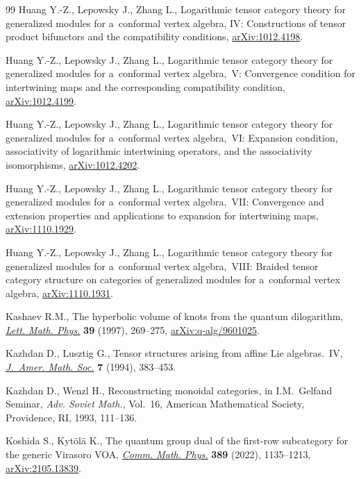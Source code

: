 \documentclass[pdftex]{sigma}
\numberwithin{equation}{section}
\theoremstyle{definition}
\begin{document}
\begin{thebibliography}{99}
Huang Y.-Z., Lepowsky J., Zhang L., Logarithmic tensor category theory for
 generalized modules for a~conformal vertex algebra, {IV}: {C}onstructions of
 tensor product bifunctors and the compatibility conditions,
 \href{http://arxiv.org/abs/1012.4198}{arXiv:1012.4198}.

Huang Y.-Z., Lepowsky J., Zhang L., Logarithmic tensor category theory for
 generalized modules for a~conformal vertex algebra,~{V}: {C}onvergence
 condition for intertwining maps and the corresponding compatibility
 condition, \href{http://arxiv.org/abs/1012.4199}{arXiv:1012.4199}.

Huang Y.-Z., Lepowsky J., Zhang L., Logarithmic tensor category theory for
 generalized modules for a~conformal vertex algebra,~{VI}: {E}xpansion
 condition, associativity of logarithmic intertwining operators, and the
 associativity isomorphisms,
 \href{http://arxiv.org/abs/1012.4202}{arXiv:1012.4202}.

Huang Y.-Z., Lepowsky J., Zhang L., Logarithmic tensor category theory for
 generalized modules for a~conformal vertex algebra,~{VII}: {C}onvergence and
 extension properties and applications to expansion for intertwining maps,
 \href{http://arxiv.org/abs/1110.1929}{arXiv:1110.1929}.

Huang Y.-Z., Lepowsky J., Zhang L., Logarithmic tensor category theory for
 generalized modules for a~conformal vertex algebra,~{VIII}: {B}raided tensor
 category structure on categories of generalized modules for a~conformal
 vertex algebra, \href{http://arxiv.org/abs/1110.1931}{arXiv:1110.1931}.

Kashaev R.M., The hyperbolic volume of knots from the quantum dilogarithm,
 \href{https://doi.org/10.1023/A:1007364912784}{\textit{Lett. Math. Phys.}}
 \textbf{39} (1997), 269--275,
 \href{http://arxiv.org/abs/q-alg/9601025}{arXiv:q-alg/9601025}.

Kazhdan D., Lusztig G., Tensor structures arising from affine {L}ie
 algebras.~{IV}, \href{https://doi.org/10.2307/2152763}{\textit{J.~Amer. Math.
 Soc.}} \textbf{7} (1994), 383--453.

Kazhdan D., Wenzl H., Reconstructing monoidal categories, in I.{M}.~{G}elfand
 {S}eminar, \textit{Adv. Soviet Math.}, Vol.~16, American Mathematical
 Society, Providence, RI, 1993, 111--136.

Koshida S., Kyt\"ol\"a K., The quantum group dual of the first-row subcategory
 for the generic {V}irasoro {VOA},
 \href{https://doi.org/10.1007/s00220-021-04266-w}{\textit{Comm. Math. Phys.}}
 \textbf{389} (2022), 1135--1213,
 \href{http://arxiv.org/abs/2105.13839}{arXiv:2105.13839}.


\end{thebibliography}
\end{document}
